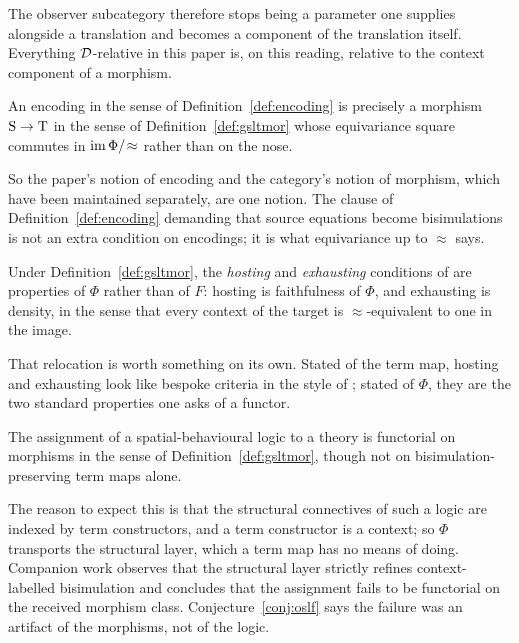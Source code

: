 \documentclass{article}
\begin{document}
The observer subcategory therefore stops being a parameter one supplies alongside a translation and becomes a component of the translation itself. Everything $\mathcal{D}$-relative in this paper is, on this reading, relative to the context component of a morphism.

\begin{proposition}
\label{cor:encmor}
    An encoding in the sense of Definition~\ref{def:encoding} is precisely a morphism $\mathrm{S}\to\mathrm{T}$ in the sense of Definition~\ref{def:gsltmor} whose equivariance square commutes in $\mathrm{im}\,\Phi/\!\approx$ rather than on the nose.
\end{proposition}

So the paper's notion of encoding and the category's notion of morphism, which have been maintained separately, are one notion. The clause of Definition~\ref{def:encoding} demanding that source equations become bisimulations is not an extra condition on encodings; it is what equivariance up to $\approx$ says.

\begin{proposition}
\label{prop:hostexh}
    Under Definition~\ref{def:gsltmor}, the \emph{hosting} and \emph{exhausting} conditions of \citep{probing} are properties of $\Phi$ rather than of $F$: hosting is faithfulness of $\Phi$, and exhausting is density, in the sense that every context of the target is $\approx$-equivalent to one in the image.
\end{proposition}

That relocation is worth something on its own. Stated of the term map, hosting and exhausting look like bespoke criteria in the style of \citet{gorla}; stated of $\Phi$, they are the two standard properties one asks of a functor.

\begin{conjecture}
\label{conj:oslf}
    The assignment of a spatial-behavioural logic to a theory is functorial on morphisms in the sense of Definition~\ref{def:gsltmor}, though not on bisimulation-preserving term maps alone.
\end{conjecture}

The reason to expect this is that the structural connectives of such a logic are indexed by term constructors, and a term constructor is a context; so $\Phi$ transports the structural layer, which a term map has no means of doing. Companion work observes that the structural layer strictly refines context-labelled bisimulation and concludes that the assignment fails to be functorial on the received morphism class. Conjecture~\ref{conj:oslf} says the failure was an artifact of the morphisms, not of the logic.
\end{document}
